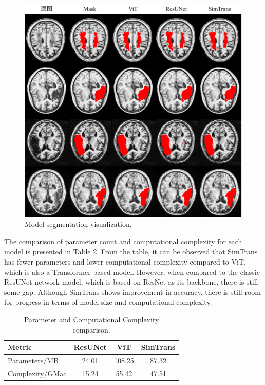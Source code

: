 \documentclass[10pt,twocolumn,a4paper]{article}
\begin{document}
\begin{figure}[htbp]   %
	\centering
	\includegraphics[width=\linewidth,scale=1.00]{Images/Results.png}
	\caption{Model segmentation visualization.}
  \label{fig:result}
\end{figure}

The comparison of parameter count and computational complexity for each model is presented in Table 2. From the table, it can be observed that SimTrans has fewer parameters and lower computational complexity compared to ViT, which is also a Transformer-based model. However, when compared to the classic ResUNet network model, which is based on ResNet as its backbone, there is still some gap. Although SimTrans shows improvement in accuracy, there is still room for progress in terms of model size and computational complexity.

\begin{table}
  \centering
  \begin{tabular}{lccc}
    \toprule
    Metric & ResUNet & ViT & SimTrans \\
    \midrule
    Parameters/MB & 24.01 & 108.25 & 87.32 \\
    Complexity/GMac & 15.24 & 55.42 & 47.51 \\
    \bottomrule
  \end{tabular}
  \caption{Parameter and Computational Complexity comparison.}
  \label{tab:result_2}
\end{table}
\end{document}
